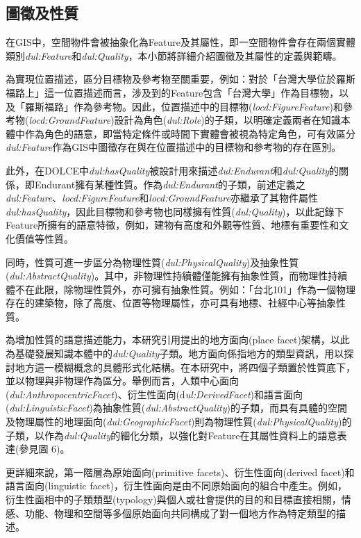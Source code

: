 % 

% 

\subsection{圖徵及性質}

在GIS中，空間物件會被抽象化為Feature及其屬性，即一空間物件會存在兩個實體類別\textit{dul:Feature}和\textit{dul:Quality}，本小節將詳細介紹圖徵及其屬性的定義與範疇。

為實現位置描述，區分目標物及參考物至關重要，例如：對於「台灣大學位於羅斯福路上」這一位置描述而言，涉及到的Feature包含「台灣大學」作為目標物，以及「羅斯福路」作為參考物。因此，位置描述中的目標物(\textit{locd:FigureFeature})和參考物(\textit{locd:GroundFeature})設計為角色(\textit{dul:Role})的子類，以明確定義兩者在知識本體中作為角色的語意，即當特定條件或時間下實體會被視為特定角色，可有效區分\textit{dul:Feature}作為GIS中圖徵存在與在位置描述中的目標物和參考物的存在區別。

此外，在DOLCE中\textit{dul:hasQuality}被設計用來描述\textit{dul:Endurant}和\textit{dul:Quality}的關係，即Endurant擁有某種性質。作為\textit{dul:Endurant}的子類，前述定義之\textit{dul:Feature}、\textit{locd:FigureFeature}和\textit{locd:GroundFeature}亦繼承了其物件屬性\textit{dul:hasQuality}，因此目標物和參考物也同樣擁有性質(\textit{dul:Quality})，以此記錄下Feature所擁有的語意特徵，例如，建物有高度和外觀等性質、地標有重要性和文化價值等性質。

同時，性質可進一步區分為物理性質(\textit{dul:PhysicalQuality})及抽象性質(\textit{dul:AbstractQuality})。其中，非物理性持續體僅能擁有抽象性質，而物理性持續體不在此限，除物理性質外，亦可擁有抽象性質。例如：「台北101」作為一個物理存在的建築物，除了高度、位置等物理屬性，亦可具有地標、社經中心等抽象性質。

為增加性質的語意描述能力，本研究引用\citet{RN39}提出的地方面向(place facet)架構，以此為基礎發展知識本體中的\textit{dul:Quality}子類。地方面向係指地方的類型資訊，用以探討地方這一模糊概念的具體形式化結構。在本研究中，將四個子類置於性質底下，並以物理與非物理作為區分。舉例而言，人類中心面向(\textit{dul:AnthropocentricFacet})、衍生性面向(d\textit{ul:DerivedFacet})和語言面向(\textit{dul:LinguisticFacet})為抽象性質(\textit{dul:AbstractQuality})的子類，而具有具體的空間及物理屬性的地理面向(\textit{dul:GeographicFacet})則為物理性質(\textit{dul:PhysicalQuality})的子類，以作為\textit{dul:Quality}的細化分類，以強化對Feature在其屬性資料上的語意表達(參見圖 6)。

更詳細來說，第一階層為原始面向(primitive facets)、衍生性面向(derived facet)和語言面向(linguistic facet)，衍生性面向是由不同原始面向的組合中產生。例如，衍生性面相中的子類類型(typology)與個人或社會提供的目的和目標直接相關，情感、功能、物理和空間等多個原始面向共同構成了對一個地方作為特定類型的描述。

